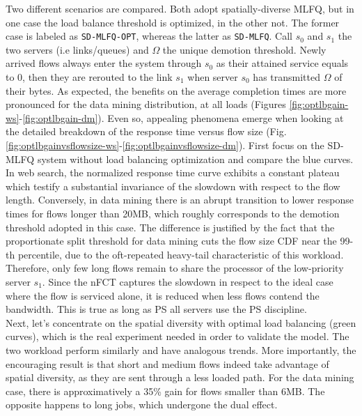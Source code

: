 Two different scenarios are compared. Both adopt spatially-diverse MLFQ, but in one case the load balance threshold is optimized, in the other not. The former case is labeled as \texttt{SD-MLFQ-OPT}, whereas the latter as \texttt{SD-MLFQ}. Call $s_0$ and $s_1$ the two servers (i.e links/queues) and $\Omega$ the unique demotion threshold. Newly arrived flows always enter the system through $s_0$ as their attained service equals to 0, then they are rerouted to the link $s_1$ when server $s_0$ has transmitted $\Omega$ of their bytes. As expected, the benefits on the average completion times are more pronounced for the data mining distribution, at all loads (Figures \ref{fig:optlbgain-ws}-\ref{fig:optlbgain-dm}). Even so, appealing phenomena emerge when looking at the detailed breakdown of the response time versus flow size (Fig.\ref{fig:optlbgainvsflowsize-ws}-\ref{fig:optlbgainvsflowsize-dm}). First focus on the SD-MLFQ system without load balancing optimization and compare the blue curves. In web search, the normalized response time curve exhibits a constant plateau which testify a substantial invariance of the slowdown with respect to the flow length. Conversely, in data mining there is an abrupt transition to lower response times for flows longer than 20MB, which roughly corresponds to the demotion threshold adopted in this case. The difference is justified by the fact that the proportionate split threshold for data mining cuts the flow size CDF near the 99-th percentile, due to the oft-repeated heavy-tail characteristic of this workload. Therefore, only few long flows remain to share the processor of the low-priority server $s_1$.  Since the  nFCT captures the slowdown in respect to the ideal case where the flow is serviced alone, it is reduced when less flows contend the bandwidth. This is true as long as PS all servers use the PS discipline. \\
Next, let's concentrate on the spatial diversity with optimal load balancing (green curves), which is the real experiment needed in order to validate the model. The two workload perform similarly and have analogous trends. More importantly, the encouraging result is that short and medium flows indeed take advantage of spatial diversity, as they are sent through a less loaded path. For the data mining case, there is approximatively a 35\% gain for flows smaller than 6MB. The opposite happens to long jobs, which undergone the dual effect.
